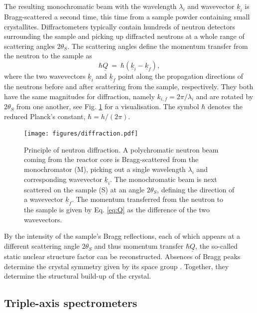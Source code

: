 The resulting monochromatic beam with the wavelength $\lambda_i$ and wavevector $\underline{k}_i$ is Bragg-scattered
a second time, this time from a sample powder containing small crystallites. Diffractometers typically contain hundreds
of neutron detectors surrounding the sample and picking up diffracted neutrons at a whole range of scattering angles
$2 \theta_S$. The scattering angles define the momentum transfer from the neutron to the sample as \cite[p. 11]{Shirane2002}
\begin{equation}
	\label{eq:Q}
	\hbar \underline{Q} \ =\  \hbar \left( \underline{k}_i - \underline{k}_f \right),
\end{equation}
where the two wavevectors $\underline{k}_i$ and $\underline{k}_f$ point along the propagation directions of the neutrons
before and after scattering from the sample, respectively. They both have the same magnitudes for diffraction, namely
$k_{i,f} = 2\pi / \lambda_i$ and are rotated by $2\theta_S$ from one another, see Fig. \ref{fig:diffraction} for a visualisation.
The symbol $\hbar$ denotes the reduced Planck's constant, $\hbar = h / \left( 2\pi \right)$.

\begin{figure}[htb]
	\centering
	\texttt{[image: figures/diffraction.pdf]}
	\caption[Neutron diffraction.]{
		Principle of neutron diffraction. A polychromatic neutron beam coming from the reactor core is Bragg-scattered
		from the monochromator (M), picking out a single wavelength $\lambda_i$ and corresponding wavevector $\underline{k}_i$.
		The monochromatic beam is next scattered on the sample (S) at an angle $2\theta_S$, defining the direction of a
		wavevector $\underline{k}_f$. The momentum transferred from the neutron to the sample is given by Eq. \ref{eq:Q}
		as the difference of the two wavevectors.}
	\label{fig:diffraction}
\end{figure}

By the intensity of the sample's Bragg reflections, each of which appears at a different scattering angle $2\theta_S$
and thus momentum transfer $\hbar \underline{Q}$, the so-called static nuclear structure factor \cite[p. 25]{Shirane2002}
can be reconstructed.
Absences of Bragg peaks determine the crystal symmetry given by its space group \cite[pp. 13-15]{Gross2012}.
Together, they determine the structural build-up of the crystal.


\subsection{Triple-axis spectrometers}

